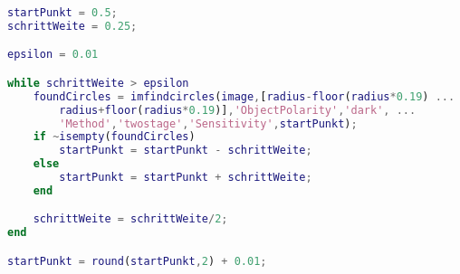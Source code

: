 \begin{lstlisting}[language=MATLAB, caption=Berechnung des Startwertes mithilfe binärer Suche, label=lst:binarySearch]
startPunkt = 0.5;
schrittWeite = 0.25;

epsilon = 0.01

while schrittWeite > epsilon
	foundCircles = imfindcircles(image,[radius-floor(radius*0.19) ... 
		radius+floor(radius*0.19)],'ObjectPolarity','dark', ...
		'Method','twostage','Sensitivity',startPunkt);
	if ~isempty(foundCircles)
		startPunkt = startPunkt - schrittWeite;
	else
		startPunkt = startPunkt + schrittWeite;
	end

	schrittWeite = schrittWeite/2;
end

startPunkt = round(startPunkt,2) + 0.01;
\end{lstlisting}